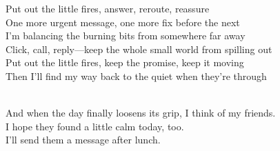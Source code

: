 \begin{lyrics}
Put out the little fires, answer, reroute, reassure\\
One more urgent message, one more fix before the next\\
I’m balancing the burning bits from somewhere far away\\
Click, call, reply—keep the whole small world from spilling out\\
Put out the little fires, keep the promise, keep it moving\\
Then I’ll find my way back to the quiet when they’re through

\\
And when the day finally loosens its grip, I think of my friends.\\
I hope they found a little calm today, too.\\
I’ll send them a message after lunch.
\end{lyrics}

